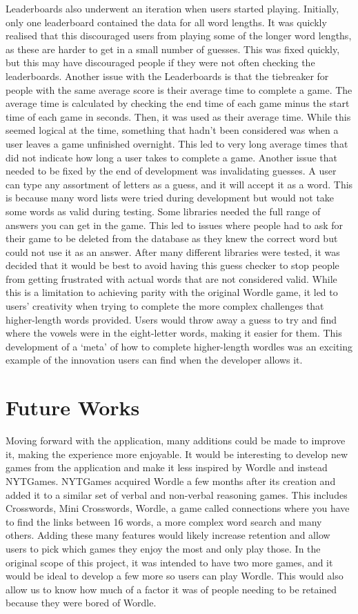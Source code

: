 Leaderboards also underwent an iteration when users started playing. Initially, only one leaderboard contained the data for all word lengths. It was quickly realised that this discouraged users from playing some of the longer word lengths, as these are harder to get in a small number of guesses. This was fixed quickly, but this may have discouraged people if they were not often checking the leaderboards. 
Another issue with the Leaderboards is that the tiebreaker for people with the same average score is their average time to complete a game. The average time is calculated by checking the end time of each game minus the start time of each game in seconds. Then, it was used as their average time. While this seemed logical at the time, something that hadn’t been considered was when a user leaves a game unfinished overnight. This led to very long average times that did not indicate how long a user takes to complete a game. 
Another issue that needed to be fixed by the end of development was invalidating guesses. A user can type any assortment of letters as a guess, and it will accept it as a word. This is because many word lists were tried during development but would not take some words as valid during testing. Some libraries needed the full range of answers you can get in the game. This led to issues where people had to ask for their game to be deleted from the database as they knew the correct word but could not use it as an answer. After many different libraries were tested, it was decided that it would be best to avoid having this guess checker to stop people from getting frustrated with actual words that are not considered valid.
 While this is a limitation to achieving parity with the original Wordle game, it led to users' creativity when trying to complete the more complex challenges that higher-length words provided. Users would throw away a guess to try and find where the vowels were in the eight-letter words, making it easier for them. This development of a ‘meta’ of how to complete higher-length wordles was an exciting example of the innovation users can find when the developer allows it. 
 
\section{Future Works}
Moving forward with the application, many additions could be made to improve it, making the experience more enjoyable. It would be interesting to develop new games from the application and make it less inspired by Wordle and instead NYTGames. NYTGames acquired Wordle a few months after its creation and added it to a similar set of verbal and non-verbal reasoning games. This includes Crosswords, Mini Crosswords, Wordle, a game called connections where you have to find the links between 16 words, a more complex word search and many others. Adding these many features would likely increase retention and allow users to pick which games they enjoy the most and only play those. In the original scope of this project, it was intended to have two more games, and it would be ideal to develop a few more so users can play Wordle. This would also allow us to know how much of a factor it was of people needing to be retained because they were bored of Wordle. 

